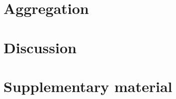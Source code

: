 \documentclass[11pt,a4paper]{report}      %
\begin{document}


\chapter{Aggregation}
\label{chap:AGG}




\chapter{Discussion}







%

\chapter*{Supplementary material}
\begin{appendices}
\renewcommand\pagenumbering[1]{}


%
\end{appendices}  
\end{document}
